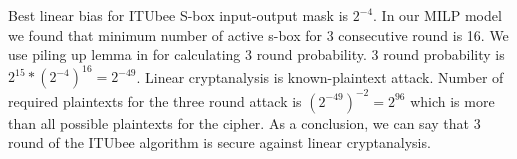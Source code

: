 Best linear bias for ITUbee S-box input-output mask is $2^{-4}$. In our MILP model we found that minimum number of active s-box for 3 consecutive round is 16. We use piling up lemma in \cite{matsui1993linear} for calculating 3 round probability. 3 round probability is $2^{15}*(2^{-4})^{16}=2^{-49}$. Linear cryptanalysis is known-plaintext attack. Number of required plaintexts for the three round attack is $(2^{-49})^{-2}= 2 ^{96}$ which is more than all possible plaintexts for the cipher. As a conclusion, we can say that 3 round of the ITUbee algorithm is secure against linear cryptanalysis.    